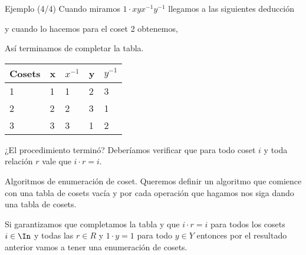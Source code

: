 \documentclass[aspectratio=169, 9pt]{beamer}
\begin{document}
\begin{frame}[fragile]{Ejemplo (4/4)}
	Cuando miramos $1 \cdot xyx^{-1}y^{-1}$ llegamos a las siguientes deducción
	\pause
	\begin{center}
	\end{center}
	\pause
	y cuando lo hacemos para el coset 2 obtenemos,
	\begin{center}
	\end{center}
	\pause
	Así terminamos de completar la tabla.
	
	\begin{table}[]
		\begin{tabular}{|l|l|l|l|l|}
			\hline
			Cosets     & x          & $x^{-1}$          & y          & $y^{-1}$          \\ \hline
			{1} & {1} & {1} & {2} & {3} \\ \hline
			{2} & {2} & {2} & {3} & {1} \\ \hline
			{3} & {3} & {3} & {1} & {2} \\ \hline
		\end{tabular}
	\end{table}
	
	
	
	
	
	¿El procedimiento terminó? 
	\pause
	Deberíamos verificar que para todo coset $i$ y toda relación $r$ vale que $i \cdot r = i$.

\end{frame}


\begin{frame}[fragile]{Algoritmos de enumeración de coset.}
	Queremos definir un algoritmo que comience con una tabla de cosets vacía y por cada operación que hagamos nos siga dando una tabla de cosets.
	
	\pause
	Si garantizamos que completamos la tabla y que $i \cdot r = i$ para todos los cosets $i \in \In$ y todas las $r \in R$ y $1 \cdot y = 1$ para todo $y \in Y$ entonces por el resultado anterior vamos a tener una enumeración de cosets.
	
\end{frame}
\end{document}
